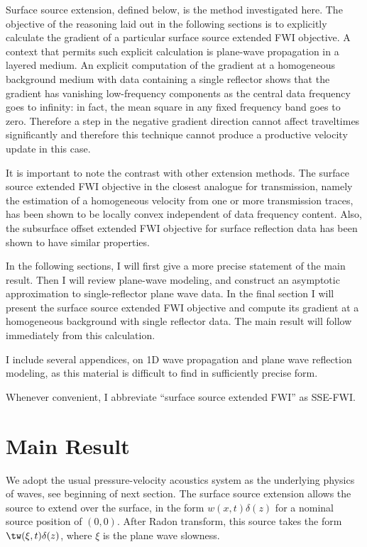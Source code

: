 Surface source extension, defined below, is the method investigated
here. The objective of the reasoning laid out in the following sections is
to explicitly calculate the gradient of a particular surface source
extended FWI objective. A context that permits such explicit
calculation is plane-wave propagation in a layered medium. An explicit
computation of the gradient at a homogeneous background medium with
data containing a single reflector shows that the gradient has
vanishing low-frequency components as the central data frequency goes
to infinity: in fact, the mean square in any fixed frequency band goes
to zero. Therefore a step in the negative gradient direction cannot
affect traveltimes significantly and therefore this technique cannot
produce a productive velocity update in this case.

It is important to note the contrast with other extension methods. The
surface source extended FWI objective in the closest analogue for
transmission, namely the estimation of a homogeneous velocity from one
or more transmission traces, has been shown to be locally convex
independent of data frequency content. Also, the subsurface offset
extended FWI objective for surface reflection data has been shown to
have similar properties.

In the following sections, I will first give a more precise statement
of the main result. Then I will review plane-wave modeling, and construct
an asymptotic approximation to single-reflector plane wave data. In
the final section I will present the surface source extended FWI
objective and compute its gradient at a homogeneous background with
single reflector data. The main result will follow immediately from
this calculation.

I include several appendices, on 1D wave propagation and plane wave
reflection modeling, as this material is difficult to find in
sufficiently precise form.

Whenever convenient, I abbreviate ``surface source extended FWI'' as SSE-FWI.

\section{Main Result}

We adopt the usual pressure-velocity acoustics system as the
underlying physics of waves, see beginning of next section. The
surface source extension allows the source to extend over the surface,
in the form $w(x,t)\delta(z)$ for a nominal source position of
$(0,0)$. After Radon transform, this source takes the form
$\tw(\xi,t)\delta(z)$, where $\xi$ is the plane wave slowness. 

